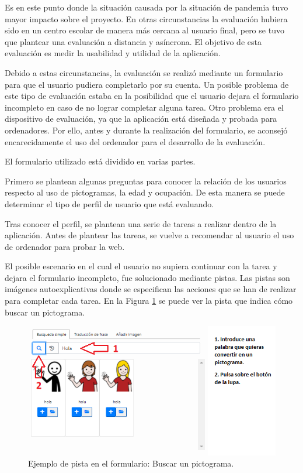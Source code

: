 Es en este punto donde la situación causada por la situación de pandemia tuvo mayor impacto sobre el proyecto. En otras circunstancias la evaluación hubiera sido en un centro escolar de manera más cercana al usuario final, pero se tuvo que plantear una evaluación a distancia y asíncrona. El objetivo de esta evaluación es medir la usabilidad y utilidad de la aplicación. 


Debido a estas circunstancias, la evaluación se realizó mediante un formulario para que el usuario pudiera completarlo por su cuenta. Un posible problema de este tipo de evaluación estaba en la posibilidad que el usuario dejara el formulario incompleto en caso de no lograr completar alguna tarea. Otro problema era el dispositivo de evaluación, ya que la aplicación está diseñada y probada para ordenadores. Por ello, antes y durante la realización del formulario, se aconsejó encarecidamente el uso del ordenador para el desarrollo de la evaluación. 

El formulario utilizado está dividido en varias partes.

Primero se plantean algunas preguntas para conocer la relación de los usuarios respecto al uso de pictogramas, la edad y ocupación. De esta manera se puede determinar el tipo de perfil de usuario que está evaluando.

Tras conocer el perfil, se plantean una serie de tareas a realizar dentro de la aplicación. Antes de plantear las tareas, se vuelve a recomendar al usuario el uso de ordenador para probar la web. 

El  posible escenario en el cual el usuario no supiera continuar con la tarea y dejara el formulario incompleto, fue solucionado mediante pistas. Las pistas son imágenes autoexplicativas donde se especifican las acciones que se han de realizar para completar cada tarea. En la Figura \ref{fig:evaPista} se puede ver la pista que indica cómo buscar un pictograma.

\begin{figure}[h!]
	\centering
	\includegraphics[width=0.8\linewidth]{Imagenes/Bitmap/evaluacionPista}
	\caption{ Ejemplo de pista en el formulario: Buscar un pictograma.
	}
	\label{fig:evaPista}
\end{figure} 


